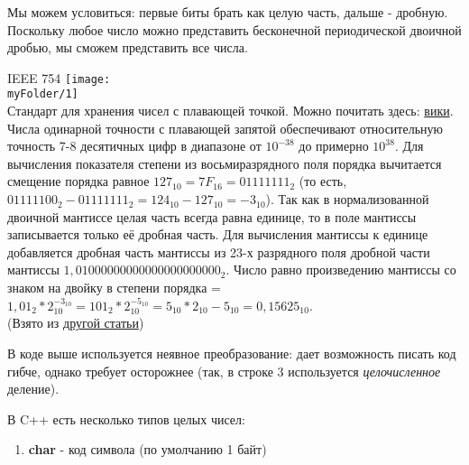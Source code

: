 \begin{lecture}[\lectureSubject]
\begin{lecSection}
	\end{lecSection}
	\begin{lecSection}
		Мы можем условиться: первые биты брать как целую часть, дальше - дробную. Поскольку любое число можно представить бесконечной периодической двоичной дробью, мы сможем представить все числа.
		\begin{lecSubsection}{IEEE 754}
						\texttt{[image: \\myFolder/1]} \\
			Стандарт для хранения чисел с плавающей точкой. Можно почитать здесь: \href{https://ru.wikipedia.org/wiki/IEEE_754-2008}{вики}. \\
			Числа одинарной точности с плавающей запятой обеспечивают относительную точность 7-8 десятичных цифр в диапазоне от $ 10^{-38}$ до примерно $ 10^{38}$.
			Для вычисления показателя степени из восьмиразрядного поля порядка вычитается смещение порядка равное $127_{10} = 7F_{16} = 01111111_2$ (то есть, $01111100_2 - 01111111_2 = 124_{10} - 127_{10} = -3_{10}$). Так как в нормализованной двоичной мантиссе целая часть всегда равна единице, то в поле мантиссы записывается только её дробная часть. Для вычисления мантиссы к единице добавляется дробная часть мантиссы из 23-х разрядного поля дробной части мантиссы $1,01000000000000000000000_2$. Число равно произведению мантиссы со знаком на двойку в степени порядка = $1,01_2*2_{10}^{-3_{10}} = 101_2*2_{10}^{-5_{10}} = 5_{10}*2_{10}-5_{10} = 0,15625_{10}$. \\
			(Взято из \href{https://ru.wikipedia.org/wiki/%D0%A7%D0%B8%D1%81%D0%BB%D0%BE_%D0%BE%D0%B4%D0%B8%D0%BD%D0%B0%D1%80%D0%BD%D0%BE%D0%B9_%D1%82%D0%BE%D1%87%D0%BD%D0%BE%D1%81%D1%82%D0%B8}
				{другой статьи})
		\end{lecSubsection}
	\end{lecSection}
	\begin{lecSection}
		В коде выше используется неявное преобразование: дает возможность писать код гибче, однако требует осторожнее (так, в строке 3 используется \textit{целочисленное} деление).
	\end{lecSection}
	\begin{lecSection}
		В C++ есть несколько типов целых чисел:
		\begin{enumerate}
			\item \textbf{char} - код символа (по умолчанию 1 байт)

\end{enumerate}
\end{lecSection}
\end{lecture}
